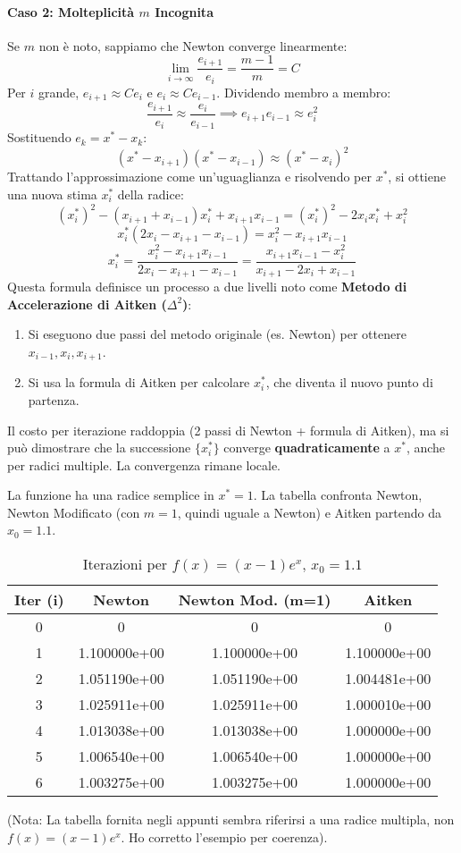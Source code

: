 \paragraph{Caso 2: Molteplicità $m$ Incognita}
Se $m$ non è noto, sappiamo che Newton converge linearmente:
$$ \lim_{i \to \infty} \frac{e_{i+1}}{e_i} = \frac{m-1}{m} = C $$
Per $i$ grande, $e_{i+1} \approx C e_i$ e $e_i \approx C e_{i-1}$. Dividendo membro a membro:
$$ \frac{e_{i+1}}{e_i} \approx \frac{e_i}{e_{i-1}} \implies e_{i+1} e_{i-1} \approx e_i^2 $$
Sostituendo $e_k = x^* - x_k$:
$$ (x^* - x_{i+1})(x^* - x_{i-1}) \approx (x^* - x_i)^2 $$
Trattando l'approssimazione come un'uguaglianza e risolvendo per $x^*$, si ottiene una nuova stima $x_i^*$ della radice:
$$ (x_i^*)^2 - (x_{i+1}+x_{i-1})x_i^* + x_{i+1}x_{i-1} = (x_i^*)^2 - 2x_i x_i^* + x_i^2 $$
$$ x_i^* (2x_i - x_{i+1} - x_{i-1}) = x_i^2 - x_{i+1}x_{i-1} $$
$$ x_i^* = \frac{x_i^2 - x_{i+1}x_{i-1}}{2x_i - x_{i+1} - x_{i-1}} = \frac{x_{i+1}x_{i-1} - x_i^2}{x_{i+1} - 2x_i + x_{i-1}} $$
Questa formula definisce un processo a due livelli noto come \textbf{Metodo di Accelerazione di Aitken ($\Delta^2$)}:
\begin{enumerate}
    \item Si eseguono due passi del metodo originale (es. Newton) per ottenere $x_{i-1}, x_i, x_{i+1}$.
    \item Si usa la formula di Aitken per calcolare $x_i^*$, che diventa il nuovo punto di partenza.
\end{enumerate}
Il costo per iterazione raddoppia (2 passi di Newton + formula di Aitken), ma si può dimostrare che la successione $\{x_i^*\}$ converge \textbf{quadraticamente} a $x^*$, anche per radici multiple. La convergenza rimane locale.

\begin{esempio}[Confronto per $f(x) = (x-1)e^x$]
La funzione ha una radice semplice in $x^*=1$. La tabella confronta Newton, Newton Modificato (con $m=1$, quindi uguale a Newton) e Aitken partendo da $x_0 = 1.1$.

\begin{table}[H]
\centering
\caption{Iterazioni per $f(x)=(x-1)e^x$, $x_0=1.1$}
\begin{tabular}{cccc}
\toprule
Iter (i) & Newton & Newton Mod. (m=1) & Aitken \\
\midrule
0 & 0 & 0 & 0 \\
1 & 1.100000e+00 & 1.100000e+00 & 1.100000e+00 \\
2 & 1.051190e+00 & 1.051190e+00 & 1.004481e+00 \\ %
3 & 1.025911e+00 & 1.025911e+00 & 1.000010e+00 \\
4 & 1.013038e+00 & 1.013038e+00 & 1.000000e+00 \\
5 & 1.006540e+00 & 1.006540e+00 & 1.000000e+00 \\
6 & 1.003275e+00 & 1.003275e+00 & 1.000000e+00 \\
\bottomrule
\end{tabular}
\end{table}
(Nota: La tabella fornita negli appunti sembra riferirsi a una radice multipla, non $f(x)=(x-1)e^x$. Ho corretto l'esempio per coerenza).
\end{esempio}